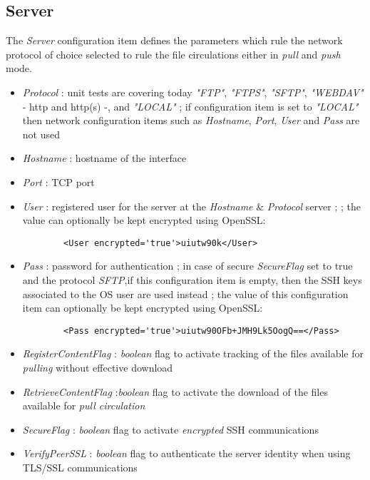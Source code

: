 \documentclass[dec_sum_main.tex]{subfiles}
\begin{document}
\subsection{Server}
The \textit{Server} configuration item defines the parameters which rule the network protocol of choice selected to rule the file circulations either in \textit{pull} and \textit{push} mode.
\par
\noindent
\begin{itemize}
	\item \textit{Protocol} : unit tests are covering today \textit{"FTP"}, \textit{"FTPS"}, \textit{"SFTP"}, \textit{"WEBDAV"} - http and http(s) -, and\textit{ "LOCAL"} ; if configuration item is set to \textit{"LOCAL"} then network configuration items such as \textit{Hostname}, \textit{Port}, \textit{User} and \textit{Pass} are not used   
	\label{Hostname}\item \textit{Hostname} : hostname of the interface
	\item \textit{Port} : TCP port
	\item \textit{User} : registered user for the server at the \textit{Hostname} \& \textit{Protocol} server ; ; the value can optionally be kept encrypted using OpenSSL:
	\begin{Verbatim}
		<User encrypted='true'>uiutw90k</User>
	\end{Verbatim}
	\item \textit{Pass} : password for authentication ; in case of secure \textit{SecureFlag} set to true and the protocol \textit{SFTP},if this configuration item is empty, then the SSH keys associated to the OS user are used instead ; the value of this configuration item can optionally be kept encrypted using OpenSSL:
	\begin{Verbatim}
		<Pass encrypted='true'>uiutw90OFb+JMH9Lk5OogQ==</Pass>
	\end{Verbatim}
	\item \textit{RegisterContentFlag} : \textit{boolean} flag to activate tracking of the files available for \textit{pulling} without effective download
	\item \textit{RetrieveContentFlag} :\textit{boolean} flag to activate the download of the files available for \textit{pull circulation} 
	\item \textit{SecureFlag} : \textit{boolean} flag to activate \textit{encrypted} SSH communications
    \label{VerifyPeerSSL}
    \item \textit{VerifyPeerSSL} : \textit{boolean} flag to authenticate the server identity when using TLS/SSL communications

\end{itemize}
\end{document}
